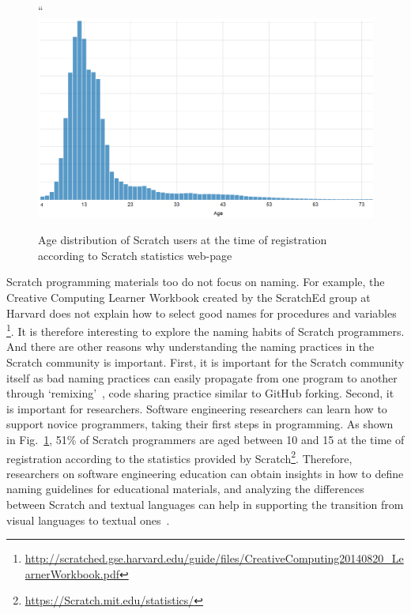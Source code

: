 \documentclass[conference]{IEEEtran}
\begin{document}
\begin{figure}[tb]
	\begin{center}
``		\includegraphics[width=\columnwidth]{fig/Scratch_users}
		\caption{Age distribution of Scratch users at the time of registration according to Scratch statistics web-page}
		\label{fig:Scratch_users}
	\end{center}
\end{figure} 

Scratch programming materials too do not focus on naming. For example, the Creative Computing Learner Workbook created by the ScratchEd group at Harvard does not explain how to select good names for procedures and variables \footnote{\url{http://scratched.gse.harvard.edu/guide/files/CreativeComputing20140820_LearnerWorkbook.pdf}}. It is therefore interesting to explore the naming habits of Scratch programmers. And there are other reasons why understanding the naming practices in the Scratch community is important. First, it is important for the Scratch community itself as bad naming practices can easily propagate from one program to another through `remixing'~\cite{Hill:Monroy-Hernandez,Davis:Kafai:Vasudevan:Lee}, code sharing practice similar to GitHub forking.
Second, it is important for researchers. Software engineering researchers can learn how to support novice programmers, taking their first steps in programming. As shown in Fig.~\ref{fig:Scratch_users}, 51\% of Scratch programmers are aged between 10 and 15 at the time of registration according to the statistics provided by Scratch\footnote{\url{https://Scratch.mit.edu/statistics/}}. Therefore, researchers on software engineering education can obtain insights in how to define naming guidelines for educational materials, and analyzing the differences between Scratch and textual languages can help in supporting the transition from visual languages to textual ones~\cite{Dann,Matsuzawa}. 
\end{document}
